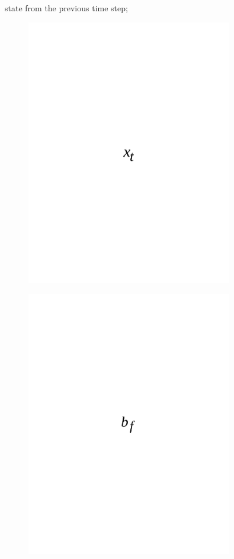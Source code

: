 state from the previous time step;
\begin{figure}[H]
	\centering
	\includegraphics[width=0.8\textwidth]{media/ict/image50}
	\caption*{}
\end{figure}

\begin{figure}[H]
	\centering
	\includegraphics[width=0.8\textwidth]{media/ict/image51}
	\caption*{}
\end{figure}

